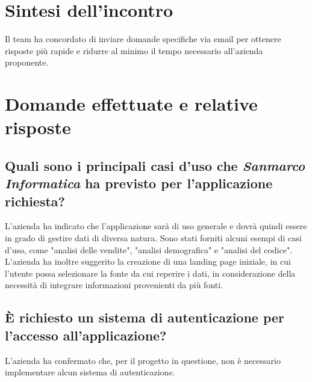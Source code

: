\documentclass[italian, 12pt]{article}
\begin{document}
\section{Sintesi dell'incontro}
Il team ha concordato di inviare domande specifiche via email per ottenere risposte più rapide e ridurre al minimo il tempo necessario all'azienda proponente.

\section{Domande effettuate e relative risposte}

\subsection{Quali sono i principali casi d'uso che \textit{Sanmarco Informatica} ha previsto per l'applicazione richiesta?}
L'azienda ha indicato che l'applicazione sarà di uso generale e dovrà quindi essere in grado di gestire dati di diversa natura. Sono stati forniti alcuni esempi di casi d'uso, come "analisi delle vendite", "analisi demografica" e "analisi del codice". L'azienda ha inoltre suggerito la creazione di una landing page iniziale, in cui l'utente possa selezionare la fonte da cui reperire i dati, in considerazione della necessità di integrare informazioni provenienti da più fonti.

\subsection{È richiesto un sistema di autenticazione per l'accesso all'applicazione?}
L'azienda ha confermato che, per il progetto in questione, non è necessario implementare alcun sistema di autenticazione.
\end{document}
